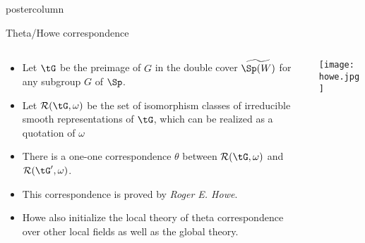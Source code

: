 \documentclass[final,hyperref={pdfpagelabels=false}]{beamer} %
\def\cR{{\mathcal{R}}}
\begin{document}
\begin{frame}
\begin{columns}
\begin{column}{.49\textwidth}
\begin{beamercolorbox}[center,wd=\textwidth]{postercolumn}
\begin{minipage}[T]{.95\textwidth}
{    \begin{block}{Theta/Howe correspondence}
      \begin{columns}
        \begin{column}{0.7\textwidth}
      \begin{itemize}
        \item Let $\tG$ be the preimage of $G$ in the double cover 
          $\widetilde{\Sp(W)}$ for any subgroup $G$ of $\Sp$.
        \item Let $\cR(\tG,\omega)$ be the set of isomorphism classes 
          of irreducible smooth representations of $\tG$,
          which can be realized as a quotation of $\omega$ 
        \item There is a one-one correspondence $\theta$
          between $\cR(\tG,\omega)$ and $\cR(\tG',\omega)$.
        \item This correspondence is proved by {\em Roger E. Howe}.
        \item Howe also initialize the local theory of theta correspondence over other local fields as well as the global theory.
      \end{itemize}
    \end{column}
    \begin{column}{0.26\textwidth}
      \texttt{[image: howe.jpg]}
    \end{column}
  \end{columns}
\end{block}


}
\end{minipage}
\end{beamercolorbox}
\end{column}
\end{columns}
\end{frame}
\end{document}
